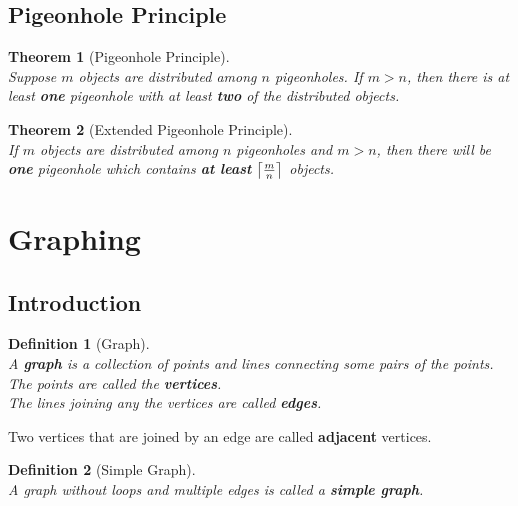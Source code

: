 \documentclass[12pt]{article}
\DeclarePairedDelimiter\ceil{\lceil}{\rceil}
\newtheorem{definition}{Definition}[section]
\newtheorem{theorem}{Theorem}[section]
\theoremstyle{definition}
\begin{document}
\subsection{Pigeonhole Principle}
\begin{theorem}[Pigeonhole Principle]\hfill\\\normalfont
Suppose $m$ objects are distributed among $n$ pigeonholes. If $m>n$, then there is at least \textbf{one} pigeonhole with at least \textbf{two} of the distributed objects.
\end{theorem}
\begin{theorem}[Extended Pigeonhole Principle]\hfill\\\normalfont
If $m$ objects are distributed among $n$ pigeonholes and $m>n$, then there will be \textbf{one} pigeonhole which contains \textbf{at least} $\ceil*{\frac{m}{n}}$ objects.
\end{theorem}
\clearpage
\section{Graphing}
\subsection{Introduction}
\begin{definition}[Graph]
\hfill\\\normalfont A \textbf{graph} is a collection of points and lines connecting \textit{some pairs} of the points.\\
The points are called the \textbf{vertices}.\\
The lines joining any the vertices are called \textbf{edges}.
\end{definition}
Two vertices that are joined by an edge are called \textbf{adjacent} vertices.
\begin{definition}[Simple Graph]
\hfill\\\normalfont A graph without loops and multiple edges is called a \textbf{simple graph}.
\end{definition}
\end{document}
